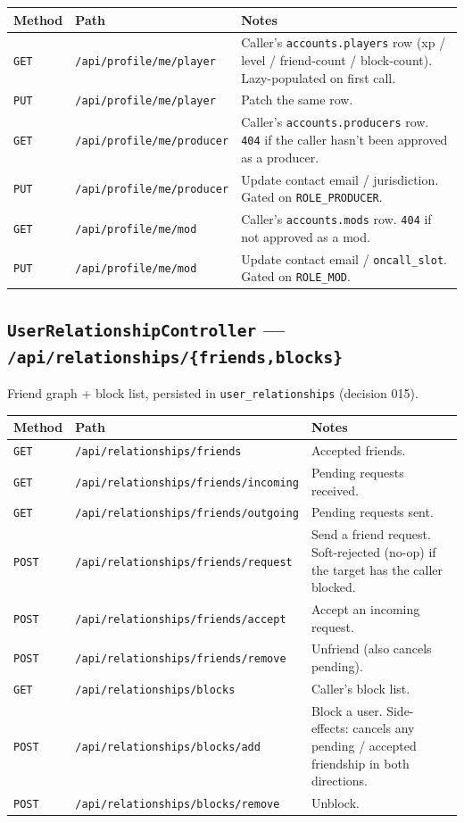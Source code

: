 \begin{tabularx}{\linewidth}{l l X}
\toprule
\textbf{Method} & \textbf{Path} & \textbf{Notes} \\
\midrule
\texttt{GET}  & \texttt{/api/profile/me/player}   & Caller's
\texttt{accounts.players} row (xp / level / friend-count /
block-count). Lazy-populated on first call. \\
\texttt{PUT}  & \texttt{/api/profile/me/player}   & Patch the same
row. \\
\texttt{GET}  & \texttt{/api/profile/me/producer} & Caller's
\texttt{accounts.producers} row. \texttt{404} if the caller hasn't
been approved as a producer. \\
\texttt{PUT}  & \texttt{/api/profile/me/producer} & Update contact
email / jurisdiction. Gated on \texttt{ROLE\_PRODUCER}. \\
\texttt{GET}  & \texttt{/api/profile/me/mod}      & Caller's
\texttt{accounts.mods} row. \texttt{404} if not approved as a mod. \\
\texttt{PUT}  & \texttt{/api/profile/me/mod}      & Update contact
email / \texttt{oncall\_slot}. Gated on \texttt{ROLE\_MOD}. \\
\bottomrule
\end{tabularx}

\subsection{\texttt{UserRelationshipController} — \texttt{/api/relationships/\{friends,blocks\}}}
Friend graph + block list, persisted in \texttt{user\_relationships}
(decision 015).

\begin{tabularx}{\linewidth}{l l X}
\toprule
\textbf{Method} & \textbf{Path} & \textbf{Notes} \\
\midrule
\texttt{GET}  & \texttt{/api/relationships/friends}          & Accepted friends. \\
\texttt{GET}  & \texttt{/api/relationships/friends/incoming} & Pending requests received. \\
\texttt{GET}  & \texttt{/api/relationships/friends/outgoing} & Pending requests sent. \\
\texttt{POST} & \texttt{/api/relationships/friends/request}  & Send a friend request. Soft-rejected (no-op) if the target has the caller blocked. \\
\texttt{POST} & \texttt{/api/relationships/friends/accept}   & Accept an incoming request. \\
\texttt{POST} & \texttt{/api/relationships/friends/remove}   & Unfriend (also cancels pending). \\
\texttt{GET}  & \texttt{/api/relationships/blocks}           & Caller's block list. \\
\texttt{POST} & \texttt{/api/relationships/blocks/add}       & Block a user. Side-effects: cancels any pending / accepted friendship in both directions. \\
\texttt{POST} & \texttt{/api/relationships/blocks/remove}    & Unblock. \\
\bottomrule
\end{tabularx}

